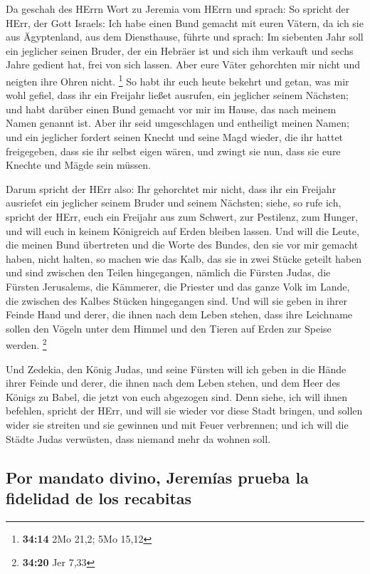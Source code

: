  Da geschah des HErrn Wort zu Jeremia vom HErrn und
sprach:  So spricht der HErr, der Gott Israels: Ich habe
einen Bund gemacht mit euren Vätern, da ich sie aus Ägyptenland, aus dem
Diensthause, führte und sprach:  Im siebenten Jahr soll
ein jeglicher seinen Bruder, der ein Hebräer ist und sich ihm verkauft
und sechs Jahre gedient hat, frei von sich lassen. Aber eure Väter
gehorchten mir nicht und neigten ihre Ohren nicht. \footnote{\textbf{34:14}
  2Mo 21,2; 5Mo 15,12}  So habt ihr euch heute bekehrt
und getan, was mir wohl gefiel, dass ihr ein Freijahr ließet ausrufen,
ein jeglicher seinem Nächsten; und habt darüber einen Bund gemacht vor
mir im Hause, das nach meinem Namen genannt ist.  Aber
ihr seid umgeschlagen und entheiligt meinen Namen; und ein jeglicher
fordert seinen Knecht und seine Magd wieder, die ihr hattet freigegeben,
dass sie ihr selbst eigen wären, und zwingt sie nun, dass sie eure
Knechte und Mägde sein müssen.

 Darum spricht der HErr also: Ihr gehorchtet mir nicht,
dass ihr ein Freijahr ausriefet ein jeglicher seinem Bruder und seinem
Nächsten; siehe, so rufe ich, spricht der HErr, euch ein Freijahr aus
zum Schwert, zur Pestilenz, zum Hunger, und will euch in keinem
Königreich auf Erden bleiben lassen.  Und will die Leute,
die meinen Bund übertreten und die Worte des Bundes, den sie vor mir
gemacht haben, nicht halten, so machen wie das Kalb, das sie in zwei
Stücke geteilt haben und sind zwischen den Teilen hingegangen,
 nämlich die Fürsten Judas, die Fürsten Jerusalems, die
Kämmerer, die Priester und das ganze Volk im Lande, die zwischen des
Kalbes Stücken hingegangen sind.  Und will sie geben in
ihrer Feinde Hand und derer, die ihnen nach dem Leben stehen, dass ihre
Leichname sollen den Vögeln unter dem Himmel und den Tieren auf Erden
zur Speise werden. \footnote{\textbf{34:20} Jer 7,33}

 Und Zedekia, den König Judas, und seine Fürsten will ich
geben in die Hände ihrer Feinde und derer, die ihnen nach dem Leben
stehen, und dem Heer des Königs zu Babel, die jetzt von euch abgezogen
sind.  Denn siehe, ich will ihnen befehlen, spricht der
HErr, und will sie wieder vor diese Stadt bringen, und sollen wider sie
streiten und sie gewinnen und mit Feuer verbrennen; und ich will die
Städte Judas verwüsten, dass niemand mehr da wohnen soll.

\hypertarget{por-mandato-divino-jeremuxedas-prueba-la-fidelidad-de-los-recabitas}{%
\subsection{Por mandato divino, Jeremías prueba la fidelidad de los
recabitas}\label{por-mandato-divino-jeremuxedas-prueba-la-fidelidad-de-los-recabitas}}

